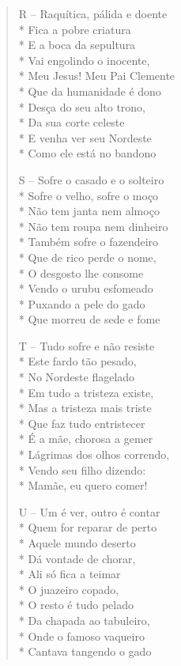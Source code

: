 \begin{verse}
R -- Raquítica, pálida e doente\\*
Fica a pobre criatura\\*
E a boca da sepultura\\*
Vai engolindo o inocente,\\*
Meu Jesus! Meu Pai Clemente\\*
Que da humanidade é dono\\*
Desça do seu alto trono,\\*
Da sua corte celeste\\*
E venha ver seu Nordeste\\*
Como ele está no bandono

S -- Sofre o casado e o solteiro\\*
Sofre o velho, sofre o moço\\*
Não tem janta nem almoço\\*
Não tem roupa nem dinheiro\\*
Também sofre o fazendeiro\\*
Que de rico perde o nome,\\*
O desgosto lhe consome\\*
Vendo o urubu esfomeado\\*
Puxando a pele do gado\\*
Que morreu de sede e fome

T -- Tudo sofre e não resiste\\*
Este fardo tão pesado,\\*
No Nordeste flagelado\\*
Em tudo a tristeza existe,\\*
Mas a tristeza mais triste\\*
Que faz tudo entristecer\\*
É a mãe, chorosa a gemer\\*
Lágrimas dos olhos correndo,\\*
Vendo seu filho dizendo:\\*
Mamãe, eu quero comer!

U -- Um é ver, outro é contar\\*
Quem for reparar de perto\\*
Aquele mundo deserto\\*
Dá vontade de chorar,\\*
Ali só fica a teimar\\*
O juazeiro copado,\\*
O resto é tudo pelado\\*
Da chapada ao tabuleiro,\\*
Onde o famoso vaqueiro\\*
Cantava tangendo o gado


\end{verse}
